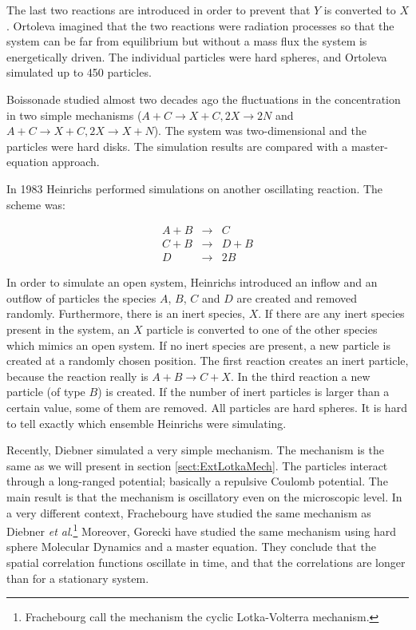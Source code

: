 The last two reactions are introduced in order to prevent that $Y$ is
converted to $X$. Ortoleva \etal imagined that the two reactions were
radiation processes so that the system can be far from equilibrium but
without a mass flux \ie the system is energetically driven. The
individual particles were hard spheres, and Ortoleva \etal simulated
up to 450 particles.  

Boissonade \cite{Boissonade79} studied almost two decades ago the
fluctuations in the concentration in two simple mechanisms
($A+C\rightarrow X+C, 2X\rightarrow 2N$ and $A+C \rightarrow X+C, 2X
\rightarrow X+N$). The system was two-dimensional and the particles
were hard disks. The simulation results are compared with a
master-equation approach.

In 1983 Heinrichs \etal \cite{Heinrichs83} performed simulations on
another oscillating reaction. The scheme was:

\begin{eqnarray*}
  A + B &\rightarrow& C     \\
  C + B &\rightarrow& D + B \\
  D     &\rightarrow& 2 B 
\end{eqnarray*}

In order to simulate an open system, Heinrichs \etal introduced an
inflow and an outflow of particles \ie the species $A$, $B$, $C$ and $D$
are created and removed randomly. Furthermore, there is an inert
species, $X$. If there are any inert species present in the system, an
$X$ particle is converted to one of the other species which mimics an
open system. If no inert species are present, a new particle is
created at a randomly chosen position. The first reaction creates an
inert particle, because the reaction really is $A+B \rightarrow
C+X$. In the third reaction a new particle (of type $B$) is
created. If the number of inert particles is larger than a certain
value, some of them are removed. All particles are hard spheres. It is
hard to tell exactly which ensemble Heinrichs \etal were simulating.

Recently, Diebner \etal \cite{Diebner95} simulated a very simple
mechanism. The mechanism is the same as we will present in section
\ref{sect:ExtLotkaMech}. The
particles interact through a long-ranged potential; basically a
repulsive Coulomb potential. The main result is that the mechanism is
oscillatory even on the microscopic level. In a very different
context, Frachebourg \etal \cite{Frachebourg96} have studied the same
mechanism as Diebner \textit{et al}.\footnote{Frachebourg \etal call the
  mechanism the cyclic Lotka-Volterra mechanism.} Moreover, Gorecki
\etal \cite{Gorecki97} have studied the same mechanism using hard
sphere Molecular Dynamics and a master equation. They conclude that the
spatial correlation functions oscillate in time, and that the
correlations are longer than for a stationary system.

